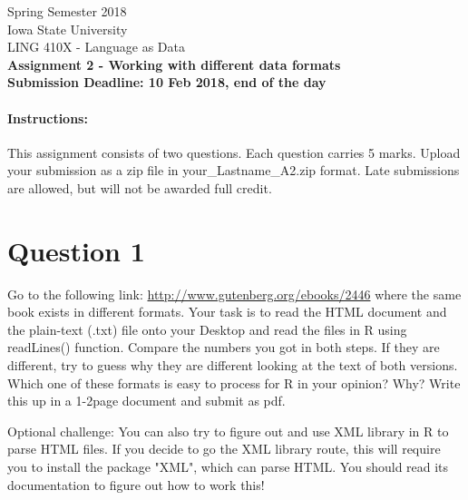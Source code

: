 \documentclass[11pt,a4paper]{article}
\begin{document}
\begin{center}
  Spring Semester 2018 \\ Iowa State University\\[3ex]
  {\large LING 410X - Language as Data}\\[3ex]
  \textbf{Assignment 2 - Working with different data formats} \\ \textbf{Submission Deadline: 10 Feb 2018, end of the day}
\end{center}


\paragraph{Instructions:} This assignment consists of two questions. Each question carries 5 marks. Upload your submission as a zip file in your\_Lastname\_A2.zip format. Late submissions are allowed, but will not be awarded full credit.

\section*{Question 1} 
Go to the following link: \url{http://www.gutenberg.org/ebooks/2446} where the same book exists in different formats. Your task is to read the HTML document and the plain-text (.txt) file onto your Desktop and read the files in R using readLines() function. Compare the numbers you got in both steps. If they are different, try to guess why they are different looking at the text of both versions. Which one of these formats is easy to process for R in your opinion? Why? Write this up in a 1-2page document and submit as pdf. 

Optional challenge: You can also try to figure out and use XML library in R to parse HTML files. If you decide to go the XML library route, this will require you to install the package "XML", which can parse HTML. You should read its documentation to figure out how to work this!


\end{document}
